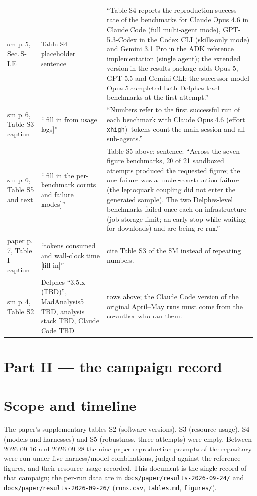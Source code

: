 \documentclass[10pt,a4paper]{article}
\newcommand{\code}[1]{\texttt{#1}}
\begin{document}
\begin{center}
\begin{tabular}{p{2.8cm}p{4.2cm}p{9.3cm}}
sm p.\,5, Sec.\,S-I.E & Table S4 placeholder sentence & ``Table S4 reports the reproduction success rate of the benchmarks for Claude Opus 4.6 in Claude Code (full multi-agent mode), GPT-5.3-Codex in the Codex CLI (skills-only mode) and Gemini 3.1 Pro in the ADK reference implementation (single agent); the extended version in the results package adds Opus 5, GPT-5.5 and Gemini CLI; the successor model Opus 5 completed both Delphes-level benchmarks at the first attempt.'' \\
sm p.\,6, Table S3 caption & ``[fill in from usage logs]'' & ``Numbers refer to the first successful run of each benchmark with Claude Opus 4.6 (effort \texttt{xhigh}); tokens count the main session and all sub-agents.'' \\
sm p.\,6, Table S5 and text & ``[fill in the per-benchmark counts and failure modes]'' & Table S5 above; sentence: ``Across the seven figure benchmarks, 20 of 21 sandboxed attempts produced the requested figure; the one failure was a model-construction failure (the leptoquark coupling did not enter the generated sample). The two Delphes-level benchmarks failed once each on infrastructure (job storage limit; an early stop while waiting for downloads) and are being re-run.'' \\
paper p.\,7, Table I caption & ``tokens consumed and wall-clock time [fill in]'' & cite Table S3 of the SM instead of repeating numbers. \\
sm p.\,4, Table S2 & Delphes ``3.5.x (TBD)'', MadAnalysis5 TBD, analysis stack TBD, Claude Code TBD & rows above; the Claude Code version of the original April--May runs must come from the co-author who ran them. \\
\bottomrule
\end{tabular}
\end{center}

\clearpage
\section*{Part II --- the campaign record}
\section{Scope and timeline}
The paper's supplementary tables S2 (software versions), S3 (resource usage), S4 (models and harnesses) and S5 (robustness, three attempts) were empty. Between 2026-09-16 and 2026-09-28 the nine paper-reproduction prompts of the repository were run under five harness/model combinations, judged against the reference figures, and their resource usage recorded. This document is the single record of that campaign; the per-run data are in \code{docs/paper/results-2026-09-24/} and \code{docs/paper/results-2026-09-26/} (\code{runs.csv}, \code{tables.md}, \code{figures/}).
\end{document}

